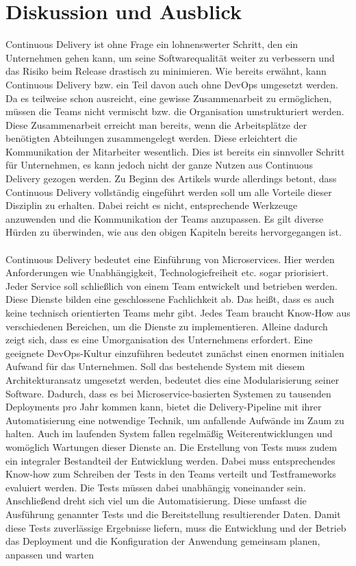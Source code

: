 \section{Diskussion und Ausblick}
Continuous Delivery ist ohne Frage ein lohnenswerter Schritt, den ein Unternehmen gehen kann, um seine Softwarequalität weiter zu verbessern und das Risiko beim Release drastisch zu minimieren. Wie bereits erwähnt, kann Continuous Delivery bzw. ein Teil davon auch ohne DevOps umgesetzt werden. Da es teilweise schon ausreicht, eine gewisse Zusammenarbeit zu ermöglichen, müssen die Teams nicht vermischt bzw. die Organisation umstrukturiert werden. Diese Zusammenarbeit erreicht man bereits, wenn die Arbeitsplätze der benötigten Abteilungen zusammengelegt werden. Diese erleichtert die Kommunikation der Mitarbeiter wesentlich. Dies ist bereits ein sinnvoller Schritt für Unternehmen, es kann jedoch nicht der ganze Nutzen aus Continuous Delivery gezogen werden. Zu Beginn des Artikels wurde allerdings betont, dass Continuous Delivery vollständig eingeführt werden soll um alle Vorteile dieser Disziplin zu erhalten. Dabei reicht es nicht, entsprechende Werkzeuge anzuwenden und die Kommunikation der Teams anzupassen. Es gilt diverse Hürden zu überwinden, wie aus den obigen Kapiteln bereits hervorgegangen ist. \\ \\
Continuous Delivery bedeutet eine Einführung von Microservices. Hier werden Anforderungen wie Unabhängigkeit, Technologiefreiheit etc. sogar priorisiert. Jeder Service soll schließlich von einem Team entwickelt und betrieben werden. Diese Dienste bilden eine geschlossene Fachlichkeit ab. Das heißt, dass es auch keine technisch orientierten Teams mehr gibt. Jedes Team braucht Know-How aus verschiedenen Bereichen, um die Dienste zu implementieren. Alleine dadurch zeigt sich, dass es eine Umorganisation des Unternehmens erfordert. Eine geeignete DevOps-Kultur einzuführen bedeutet zunächst einen enormen initialen Aufwand für das Unternehmen. Soll das bestehende System mit diesem Architekturansatz umgesetzt werden, bedeutet dies eine Modularisierung seiner Software. Dadurch, dass es bei Microservice-basierten Systemen zu tausenden Deployments pro Jahr kommen kann, bietet die Delivery-Pipeline mit ihrer Automatisierung eine notwendige Technik, um anfallende Aufwände im Zaum zu halten. Auch im laufenden System fallen regelmäßig Weiterentwicklungen und womöglich Wartungen dieser Dienste an. Die Erstellung von Tests muss zudem ein integraler Bestandteil der Entwicklung werden. Dabei muss entsprechendes Know-how zum Schreiben der Tests in den Teams verteilt und Testframeworks evaluiert werden. Die Tests müssen dabei unabhängig voneinander sein. Anschließend dreht sich viel um die Automatisierung. Diese umfasst die Ausführung genannter Tests und die Bereitstellung resultierender Daten. Damit diese Tests zuverlässige Ergebnisse liefern, muss die Entwicklung und der Betrieb das Deployment und die Konfiguration der Anwendung gemeinsam planen, anpassen und warten \cite{Birk.2014} \\ \\
